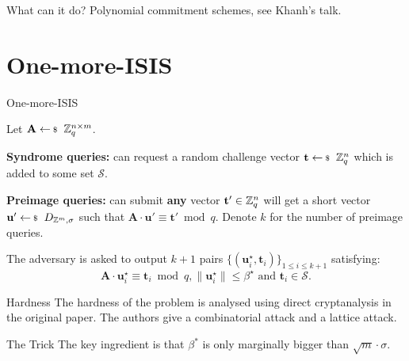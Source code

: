 \documentclass[xcolor=table,10pt,aspectratio=169]{beamer}
\renewcommand{\vec}[1]{\ensuremath{\mathbf{#1}}\xspace}
\providecommand{\mat}[1]{\ensuremath{\vec{#1}}\xspace}
\begin{document}
\begin{frame}[label={sec:org0d2494a}]{What can it do?}
Polynomial commitment schemes, see Khanh's talk.
\end{frame}

\section{One-more-ISIS}
\label{sec:org0aefc24}

\begin{frame}[label={sec:org5e0eaed}]{One-more-ISIS}
\begin{definition}
Let \(\mat{A} \sample \ZZ_{q}^{n \times m}\).

\textbf{Syndrome queries:} can request a random challenge vector \(\vec{t} \sample \ZZ_{q}^{n}\) which is added to some set \(\mathcal{S}\).

\textbf{Preimage queries:} can submit \textbf{any} vector \(\vec{t}' \in \ZZ_{q}^{n}\) will get a short vector \(\vec{u}' \sample D_{\ZZ^m,\sigma}\) such that \(\mat{A} \cdot \vec{u}' \equiv \vec{t}' \bmod q\). Denote \(k\) for the number of preimage queries.

The adversary is asked to output \(k+1\) pairs \(\{(\vec{u}^{\star}_i,\vec{t}_i)\}_{1 \le i \leq k+1}\) satisfying:
\[\mat{A}\cdot \vec{u}_{i}^{\star} \equiv \vec{t}_{i} \bmod q, \|\vec{u}^\star_{i}\| \leq \beta^{\star} \text{ and }\vec{t}_{i} \in \mathcal{S}.\]
\end{definition}

{\footnotesize {} \par}
\end{frame}

\begin{frame}[label={sec:org6703427}]{Hardness}
The hardness of the problem is analysed using direct cryptanalysis in the original paper. The authors give a combinatorial attack and a lattice attack.

\begin{block}{The Trick}
The key ingredient is that \(\beta^{*}\) is only marginally bigger than \(\sqrt{m} \cdot \sigma\).
\end{block}
\end{frame}
\end{document}
